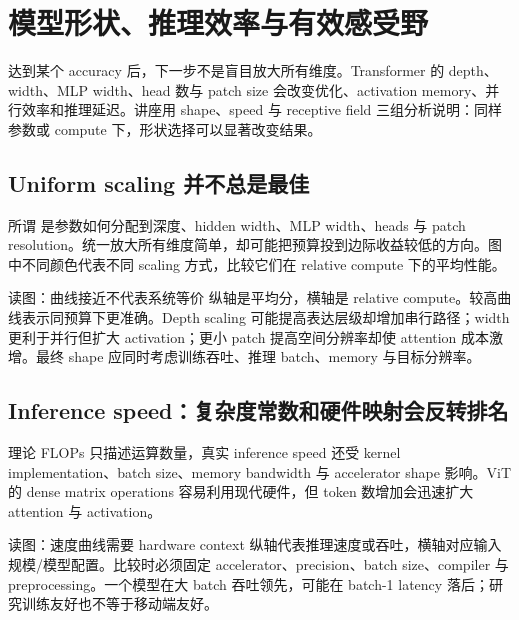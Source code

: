 \section{模型形状、推理效率与有效感受野}

达到某个 accuracy 后，下一步不是盲目放大所有维度。Transformer 的 depth、width、MLP width、head 数与 patch size 会改变优化、activation memory、并行效率和推理延迟。讲座用 shape、speed 与 receptive field 三组分析说明：同样参数或 compute 下，形状选择可以显著改变结果。

\subsection{Uniform scaling 并不总是最佳}

所谓  是参数如何分配到深度、hidden width、MLP width、heads 与 patch resolution。统一放大所有维度简单，却可能把预算投到边际收益较低的方向。图中不同颜色代表不同 scaling 方式，比较它们在 relative compute 下的平均性能。


\begin{knowledgebox}{读图：曲线接近不代表系统等价}
纵轴是平均分，横轴是 relative compute。较高曲线表示同预算下更准确。Depth scaling 可能提高表达层级却增加串行路径；width 更利于并行但扩大 activation；更小 patch 提高空间分辨率却使 attention 成本激增。最终 shape 应同时考虑训练吞吐、推理 batch、memory 与目标分辨率。
\end{knowledgebox}

\subsection{Inference speed：复杂度常数和硬件映射会反转排名}

理论 FLOPs 只描述运算数量，真实 inference speed 还受 kernel implementation、batch size、memory bandwidth 与 accelerator shape 影响。ViT 的 dense matrix operations 容易利用现代硬件，但 token 数增加会迅速扩大 attention 与 activation。


\begin{knowledgebox}{读图：速度曲线需要 hardware context}
纵轴代表推理速度或吞吐，横轴对应输入规模/模型配置。比较时必须固定 accelerator、precision、batch size、compiler 与 preprocessing。一个模型在大 batch 吞吐领先，可能在 batch-1 latency 落后；研究训练友好也不等于移动端友好。
\end{knowledgebox}

